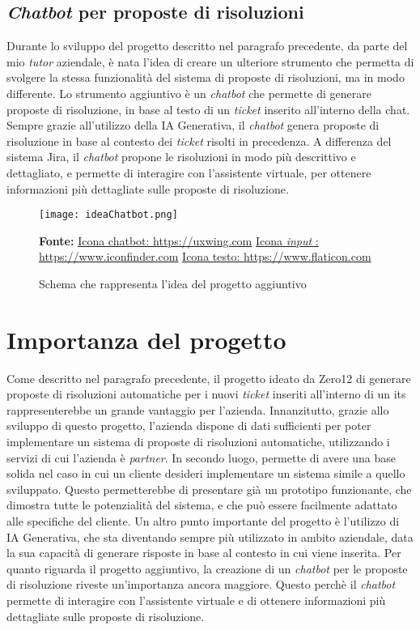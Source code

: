 \subsection{\textit{Chatbot} per proposte di risoluzioni}
Durante lo sviluppo del progetto descritto nel paragrafo precedente, da parte del mio \textit{tutor} aziendale, è nata l'idea di creare un ulteriore strumento che permetta di svolgere la stessa funzionalità del sistema di proposte di risoluzioni, ma in modo differente. Lo strumento aggiuntivo è un \textit{chatbot} che permette di generare proposte di risoluzione, in base al testo di un \textit{ticket} inserito all'interno della chat. 
Sempre grazie all'utilizzo della IA Generativa, il \textit{chatbot} genera proposte di risoluzione in base al contesto dei \textit{ticket} risolti in precedenza. A differenza del sistema Jira, il \textit{chatbot} propone le risoluzioni in modo più descrittivo e dettagliato, e permette di interagire con l'assistente virtuale, per ottenere informazioni più dettagliate sulle proposte di risoluzione.
\begin{figure}[H]
    \centering
    \texttt{[image: ideaChatbot.png]}
    \caption{Schema che rappresenta l'idea del progetto aggiuntivo}
    \label{fig:ideaChatbot}
    \small \textbf{Fonte:} \href{https://uxwing.com/chatbot-icon/}{Icona chatbot: https://uxwing.com} \href{https://www.iconfinder.com/icons/351012/field_input_search_icon}{Icona \textit{input} : https://www.iconfinder.com} \href{https://www.flaticon.com/free-icon/text-file_5116156} {Icona testo: https://www.flaticon.com}

\end{figure}
\section{Importanza del progetto}
Come descritto nel paragrafo precedente, il progetto ideato da Zero12 di generare proposte di risoluzioni automatiche per i nuovi \textit{ticket} inseriti all'interno di un \gls{its} rappresenterebbe un grande vantaggio per l'azienda. Innanzitutto, 
grazie allo sviluppo di questo progetto, l'azienda dispone di dati sufficienti per poter implementare un sistema di proposte di risoluzioni automatiche, utilizzando i servizi di cui l'azienda è \textit{partner}. In secondo luogo, permette di avere una base solida nel 
caso in cui un cliente desideri implementare un sistema simile a quello sviluppato. Questo permetterebbe di presentare già un prototipo funzionante, che dimostra tutte le potenzialità del sistema, e che può essere facilmente adattato alle specifiche del cliente.
Un altro punto importante del progetto è l'utilizzo di IA Generativa, che sta diventando sempre più utilizzato in ambito aziendale, data la sua capacità di generare risposte in base al contesto in cui viene inserita.
Per quanto riguarda il progetto aggiuntivo, la creazione di un \textit{chatbot} per le proposte di risoluzione riveste un'importanza ancora maggiore. Questo perchè il \textit{chatbot} permette di interagire con l'assistente virtuale e di ottenere informazioni più dettagliate sulle proposte di risoluzione.
